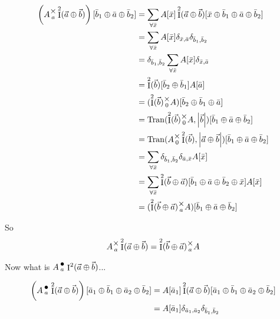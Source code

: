 \documentclass[12pt]{book}
\theoremstyle{plain}
\theoremstyle{definition}
\theoremstyle{ppart}
\theoremstyle{case}
\theoremstyle{solution}
\DeclareMathOperator{\Ident}{I}
\DeclareMathOperator{\Tran}{Tran}
\newcommand{\mmult}[1]{\text{\raisebox{1ex}{$\underset{#1}{\times}$}}}
\newcommand{\dmult}[1]{\text{\raisebox{1ex}{$\underset{#1}{\,\bullet\,}$}}}
\newcommand{\shape}[1]{\left|#1\right|}
\begin{document}
\begin{appendices}
\begin{align*}
\left(A \mmult{a} \Ident^2(\vec{a} \oplus \vec{b}) \right)[\bar{b}_1 \oplus \bar{a} \oplus \bar{b}_2]
  &= 
  \sum_{\forall \bar{x}}
    A[\bar{x}] \Ident^2(\vec{a} \oplus \vec{b})[\bar{x} \oplus \bar{b}_1 \oplus \bar{a} \oplus \bar{b}_2] \\
  &= 
  \sum_{\forall \bar{x}}
    A[\bar{x}] \delta_{\bar{x},\bar{a}} \delta_{\bar{b}_1,\bar{b}_2} \\
  &=
  \delta_{\bar{b}_1,\bar{b}_2}
  \sum_{\forall \bar{x}}
    A[\bar{x}] \delta_{\bar{x},\bar{a}} \\
  &=
  \Ident^2(\vec{b})[\bar{b}_2 \oplus \bar{b}_1]
  A[\bar{a}] \\
  &=
  (\Ident^2(\vec{b}) \mmult{0} A) [\bar{b}_2 \oplus \bar{b}_1 \oplus \bar{a}] \\
  &=
  \Tran(\Ident^2(\vec{b}) \mmult{0} A, \shape{\vec{b}})[\bar{b}_1 \oplus \bar{a} \oplus \bar{b}_2] \\
  &=
  \Tran(A \mmult{0} \Ident^2(\vec{b}), \shape{\vec{a} \oplus \vec{b}})[\bar{b}_1 \oplus \bar{a} \oplus \bar{b}_2] \\
  &= 
  \sum_{\forall \bar{x}}
    \delta_{\bar{b}_1,\bar{b}_2} \delta_{\bar{a},\bar{x}} A[\bar{x}] \\
  &= 
  \sum_{\forall \bar{x}}
    \Ident^2(\vec{b} \oplus \vec{a})[\bar{b}_1 \oplus \bar{a} \oplus \bar{b}_2 \oplus \bar{x}]
    A[\bar{x}] \\
  &= 
  (\Ident^2(\vec{b} \oplus \vec{a}) \mmult{a} A) [\bar{b}_1 \oplus \bar{a} \oplus \bar{b}_2]
\end{align*}

So
\[ A \mmult{a} \Ident^2(\vec{a} \oplus \vec{b}) = \Ident^2(\vec{b} \oplus \vec{a}) \mmult{a} A \]

Now what is $A \dmult{a} \Ident^2(\vec{a} \oplus \vec{b})$...

\begin{align*}
\left(A \dmult{a} \Ident^2(\vec{a} \oplus \vec{b})\right) [\bar{a}_1 \oplus \bar{b}_1 \oplus \bar{a}_2 \oplus \bar{b}_2]
  &=
  A [\bar{a}_1] \Ident^2(\vec{a} \oplus \vec{b}) [\bar{a}_1 \oplus \bar{b}_1 \oplus \bar{a}_2 \oplus \bar{b}_2] \\
  &=
  A [\bar{a}_1] \delta_{\bar{a}_1, \bar{a}_2} \delta_{\bar{b}_1, \bar{b}_2}
\end{align*}


\end{appendices}
\end{document}
